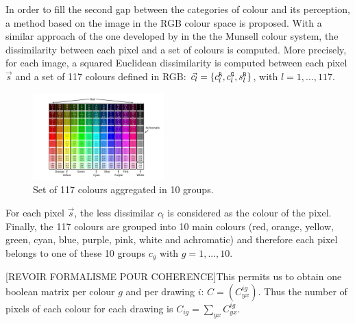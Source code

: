 \documentclass[11pt,a4paper]{article}
\begin{document}
In order to fill the second gap between the categories of colour and its
perception, a method based on the image in the RGB colour space is
proposed. With a similar approach of the one developed by
\cite{kimbaelee2007} in the the Munsell colour system, the dissimilarity
between each pixel and a set of colours is computed. More precisely, for
each image, a squared Euclidean dissimilarity is computed between each
pixel \(\vec{s}\) and a set of 117 colours defined in RGB:
\(\vec{c_l} = \{ c^{\tt \scriptstyle R}_{l}, c^{\tt \scriptstyle G}_{l}, s^{\tt \scriptstyle B}_{l} \}\),
with \(l = 1, ..., 117\).

\begin{figure}
\centering
\includegraphics[width=0.45\textwidth]{figures/Col_tab.pdf}
\caption{Set of 117 colours aggregated in 10 groups. \label{117colours}}
\end{figure}

For each pixel \(\vec{s}\), the less dissimilar \(c_l\) is considered as
the colour of the pixel. Finally, the 117 colours are grouped into 10
main colours (red, orange, yellow, green, cyan, blue, purple, pink,
white and achromatic) and therefore each pixel belongs to one of these
10 groups \(c_g\) with \(g=1,...,10\).

{[}REVOIR FORMALISME POUR COHERENCE{]}This permits us to obtain one
boolean matrix per colour \(g\) and per drawing \(i\):
\(C=(C_{yx}^{ig})\). Thus the number of pixels of each colour for each
drawing is \(C_{ig} = \sum_{yx}C_{yx}^{ig}\).

\clearpage


\end{document}
